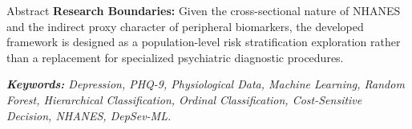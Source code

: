 \documentclass{uetgraduation}
\begin{document}
\begin{preamble}{Abstract}
\textbf{Research Boundaries:} Given the cross-sectional nature of NHANES and the indirect proxy character of peripheral biomarkers, the developed framework is designed as a population-level risk stratification exploration rather than a replacement for specialized psychiatric diagnostic procedures.

\vspace{0.6cm}
\noindent \textit{\textbf{Keywords:} Depression, PHQ-9, Physiological Data, Machine Learning, Random Forest, Hierarchical Classification, Ordinal Classification, Cost-Sensitive Decision, NHANES, DepSev-ML.}
\end{preamble}

\begin{contentlisting}
\tableofcontents
\listoffigures
\listoftables


\end{contentlisting}
\end{document}
